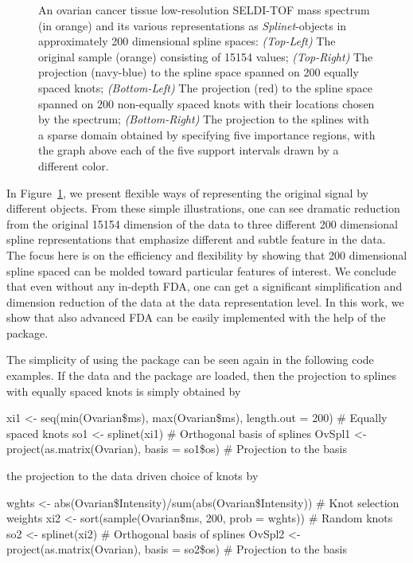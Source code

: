 \begin{figure}[t!]
        \caption{\footnotesize  An ovarian cancer tissue low-resolution SELDI-TOF mass spectrum (in orange) and its various representations as \emph{Splinet}-objects in approximately 200 dimensional spline spaces: \emph{(Top-Left)} The original sample (orange) consisting of 15154 values; \emph{(Top-Right)} The projection (navy-blue) to the spline space spanned on 200 equally spaced knots; \emph{(Bottom-Left)} The projection (red) to the spline space spanned on 200 non-equally spaced knots with their locations chosen by the spectrum; \emph{(Bottom-Right)} The projection to the splines with a sparse domain obtained by specifying five importance regions, with the graph above each of the five support intervals drawn by a different color.\vspace{-5mm}}
    \label{fig:MSSpectrum}
\end{figure}


In Figure~\ref{fig:MSSpectrum}, we present flexible ways of representing the original signal by different  objects. From these simple illustrations, one can see dramatic reduction from the original 15154 dimension of the data to three different 200 dimensional spline representations that emphasize different and subtle feature in the data. 
The focus here is on the efficiency and flexibility by showing that 200 dimensional spline spaced can be molded toward particular features of interest.
We conclude that even without any in-depth FDA, one can get a significant simplification and dimension reduction of the data at the data representation level. 
In this work, we show that also advanced FDA can be easily implemented with the help of the package.


The simplicity of using the  package can be seen again in the following code examples. If the  data and the  package are loaded, then the projection to splines with equally spaced knots is simply obtained by

\begin{example}
xi1 <- seq(min(Ovarian\$ms), max(Ovarian\$ms), length.out = 200) # Equally spaced knots 
so1 <- splinet(xi1)                                       # Orthogonal basis of splines
OvSpl1 <- project(as.matrix(Ovarian), basis = so1\$os)        # Projection to the basis
\end{example}
\noindent the projection to the data driven choice of knots by

\begin{example}
wghts <- abs(Ovarian\$Intensity)/sum(abs(Ovarian\$Intensity))  # Knot selection weights
xi2 <- sort(sample(Ovarian\$ms, 200, prob = wghts))            # Random knots
so2 <- splinet(xi2)                                        # Orthogonal basis of splines
OvSpl2 <- project(as.matrix(Ovarian), basis = so2\$os)         # Projection to the basis
\end{example}


